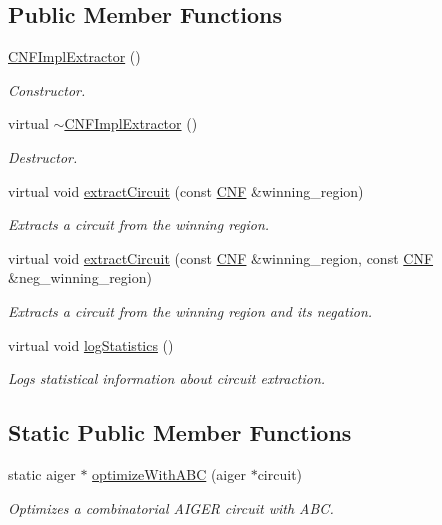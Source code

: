 \subsection*{Public Member Functions}
\begin{DoxyCompactItemize}
\item 
\hyperlink{classCNFImplExtractor_a85fadc5cccc76524d9317041c1be1744}{C\-N\-F\-Impl\-Extractor} ()
\begin{DoxyCompactList}\small\item\em Constructor. \end{DoxyCompactList}\item 
virtual \hyperlink{classCNFImplExtractor_a5c2daeeda948fce2f2d9b361d8b06416}{$\sim$\-C\-N\-F\-Impl\-Extractor} ()
\begin{DoxyCompactList}\small\item\em Destructor. \end{DoxyCompactList}\item 
virtual void \hyperlink{classCNFImplExtractor_ad329eedd50e443f44edc99db8c2e2613}{extract\-Circuit} (const \hyperlink{classCNF}{C\-N\-F} \&winning\-\_\-region)
\begin{DoxyCompactList}\small\item\em Extracts a circuit from the winning region. \end{DoxyCompactList}\item 
virtual void \hyperlink{classCNFImplExtractor_a5e9694425af3f1a76d8b21ace3c435d9}{extract\-Circuit} (const \hyperlink{classCNF}{C\-N\-F} \&winning\-\_\-region, const \hyperlink{classCNF}{C\-N\-F} \&neg\-\_\-winning\-\_\-region)
\begin{DoxyCompactList}\small\item\em Extracts a circuit from the winning region and its negation. \end{DoxyCompactList}\item 
virtual void \hyperlink{classCNFImplExtractor_aae098749e201b22294a70f6e0a4a58f0}{log\-Statistics} ()
\begin{DoxyCompactList}\small\item\em Logs statistical information about circuit extraction. \end{DoxyCompactList}\end{DoxyCompactItemize}
\subsection*{Static Public Member Functions}
\begin{DoxyCompactItemize}
\item 
static aiger $\ast$ \hyperlink{classCNFImplExtractor_ad21828d816dfdbf672f6e595589ef6e7}{optimize\-With\-A\-B\-C} (aiger $\ast$circuit)
\begin{DoxyCompactList}\small\item\em Optimizes a combinatorial A\-I\-G\-E\-R circuit with A\-B\-C. \end{DoxyCompactList}\end{DoxyCompactItemize}
